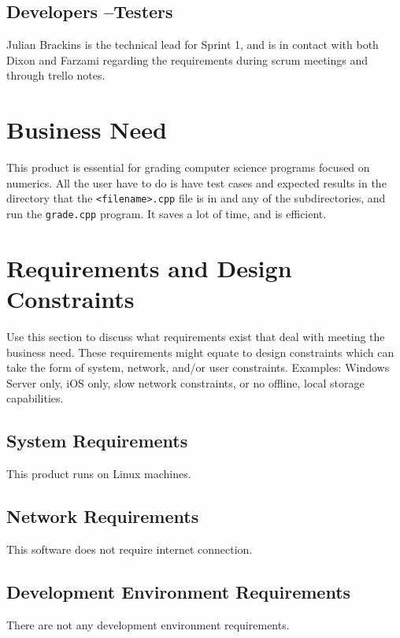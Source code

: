 

\subsection{Developers --Testers}
Julian Brackins is the technical lead for Sprint 1, and is in contact with both Dixon and Farzami regarding the requirements during scrum meetings and through trello notes. 



\section{Business Need}
This product is essential for grading computer science programs focused on numerics. All the user have to do is have test cases and expected results in the directory that the {\tt <filename>.cpp} file is in and any of the subdirectories, and run the {\tt grade.cpp} program. It saves a lot of time, and is efficient. 

\section{Requirements and Design Constraints}
Use this section to discuss what requirements exist that deal with meeting the 
business need.  These requirements might equate to design constraints which can 
take the form of system, network, and/or user constraints.  Examples:  Windows 
Server only, iOS only, slow network constraints, or no offline, local storage capabilities. 


\subsection{System  Requirements}
This product runs on Linux machines. 


\subsection{Network Requirements}
This software does not require internet connection. 


\subsection{Development Environment Requirements}
There are not any development environment requirements.


